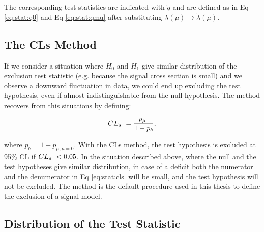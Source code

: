 \noindent The corresponding test statistics are indicated with $\tilde{q}$ and are defined as in Eq \ref{eq:stat:q0} and Eq \ref{eq:stat:qmu} after substituting $\lambda({\mu}) \rightarrow \tilde{\lambda}({\mu})$.

\iffalse
\begin{equation}
\label{eq:stat:q:excl}
\qmu = - 2 \ln \tilde{\lambda}(\mu) =
\left\{ \! \! \begin{array}{ll}
               - 2 \ln \frac{L(\mu, \hat{\hat{\vec{\theta}}}(\mu))}
                {L(0, \hat{\hat{\theta}}(0))}
                & \quad \hat{\mu} < 0  \;, \\*[0.2 cm]
               -2 \ln \frac{L(\mu, \hat{\hat{\vec{\theta}}}(\mu))}
                {L(\hat{\mu}, \hat{\vec{\theta}})}
&  \quad \hat{\mu} \ge 0  \;.
              \end{array}
       \right.
\end{equation}
\fi

\subsection{The CLs Method}

If we consider a situation where $H_0$ and $H_1$ give similar distribution of the exclusion test statistic (e.g. because the signal cross section is
small) and we observe a downward fluctuation in data, we could end up excluding the test hypothesis, even if almost indistinguishable from the null hypothesis. The \cls method \cite{JUNK1999435} recovers from this situations by defining:

\begin{equation}
\label{eq:stat:cls}
CL_s \  = \dfrac{p_\mu \ }{1 - p_b} , 
\end{equation}

\noindent where $p_b = 1 - p_{\mu, \mu=0}$. With the CLs method, the test hypothesis is excluded at 95\% CL if $CL_s \  < 0.05$. In the situation described above, where the null and the test hypotheses give similar \qmu distribution, in case of a deficit both the numerator and the denumerator in Eq \ref{eq:stat:cls} will be small, and the test hypothesis will not be excluded. The \cls method is the default procedure used in this thesis to define the exclusion of a signal model. 

\subsection{Distribution of the Test Statistic}

